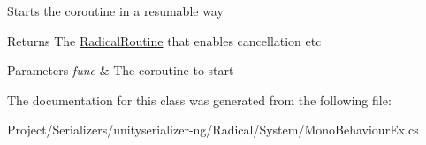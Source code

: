 Starts the coroutine in a resumable way 

\begin{DoxyReturn}{Returns}
The \hyperlink{class_radical_routine}{Radical\+Routine} that enables cancellation etc 
\end{DoxyReturn}

\begin{DoxyParams}{Parameters}
{\em func} & The coroutine to start \\
\hline
\end{DoxyParams}


The documentation for this class was generated from the following file\+:\begin{DoxyCompactItemize}
\item 
Project/\+Serializers/unityserializer-\/ng/\+Radical/\+System/Mono\+Behaviour\+Ex.\+cs\end{DoxyCompactItemize}
